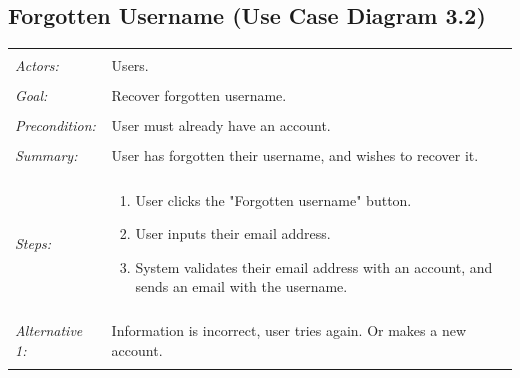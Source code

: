 \documentclass[11pt]{report}
\begin{document}
\subsection{Forgotten Username (Use Case Diagram 3.2)}
\begin{tabular}{ p{2cm} p{12cm} }
 \hline
 \\
 \textit{Actors:} & Users. \\ 
  \\
 \textit{Goal:} & Recover forgotten username. \\ 
 \\
 \textit{Precondition:} & User must already have an account. \\
 \\
 \textit{Summary:}  & User has forgotten their username, and wishes to recover it. \\
 \\
 \textit{Steps:} & \begin{enumerate}
    \item User clicks the "Forgotten username" button.
    \item User inputs their email address.
    \item System validates their email address with an account, and sends an email with the username.
 \end{enumerate} \\
\\
  \textit{Alternative 1:} & Information is incorrect, user tries again. Or makes a new account. \\
\\
\hline
\end{tabular}
\end{document}
